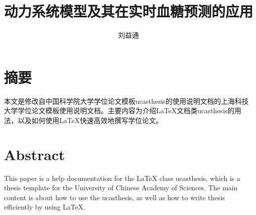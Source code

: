 \confidential{}%
\title{动力系统模型及其在实时血糖预测的应用}%
\author{刘益通}%
\advisorsec{}%
\englishdate{\quad / \quad /\quad}%

\chapter*{摘\quad 要}%
\setcounter{page}{1}%

本文是修改自中国科学院大学学位论文模板ucasthesis的使用说明文档的上海科技大学学位论文模板使用说明文档。主要内容为介绍\LaTeX{}文档类ucasthesis的用法，以及如何使用\LaTeX{}快速高效地撰写学位论文。

\chapter*{Abstract}%

This paper is a help documentation for the \LaTeX{} class ucasthesis, which is  a thesis template for the University of Chinese Academy of Sciences. The main content is about how to use the ucasthesis, as well as how to write thesis efficiently by using \LaTeX{}.

